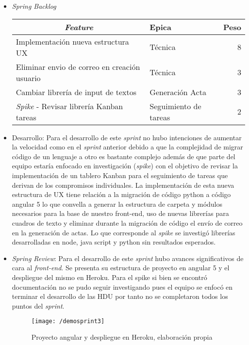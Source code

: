 \begin{itemize}
\begin{itemize}
\item \textit{Spring Backlog}

\begin{table}[!h]
\centering
\label{tab:backlog3}
\begin{tabular}{|l|l|r|}
\hline
\multicolumn{1}{|c|}{\textit{\textbf{Feature}}} & \textbf{Epica} & \textbf{Peso} \\ \hline
Implementación nueva estructura UX & Técnica & 8 \\ \hline
Eliminar envio de correo en creación usuario & Técnica & 3 \\ \hline
Cambiar librería de input de textos & Generación Acta & 3 \\ \hline
\textit{Spike} -  Revisar librería Kanban tareas & Seguimiento de tareas & 2 \\ \hline
\end{tabular}
\end{table}

\item Desarrollo: Para el desarrollo de este \textit{sprint} no hubo intenciones de aumentar la velocidad como en el \textit{sprint} anterior debido a que la complejidad de migrar código de un lenguaje a otro es bastante complejo además de que parte del equipo estaría enfocado en investigación (\textit{spike}) con el objetivo de revisar la implementación de un tablero Kanban para el seguimiento de tareas que derivan de los compromisos individuales. La implementación de esta nueva estructura de UX tiene relación a la migración de código python a código angular 5 lo que convella a generar la estructura de carpeta y módulos necesarios para la base de nuestro front-end, uso de nuevas librerías para cuadros de texto y eliminar durante la migración de código el envío de correo en la generación de actas. Lo que corresponde al \textit{spike} se investigó librerías desarrolladas en node, java script y python sin resultados esperados.

\item \textit{Spring Review}: Para el desarrollo de este \textit{sprint} hubo avances significativos de cara al \textit{front-end}. Se presenta su estructura de proyecto en angular 5 y el despliegue del mismo en Heroku. Para el spike si bien se encontró documentación no se pudo seguir investigando pues el equipo se enfocó en terminar el desarrollo de las HDU por tanto no se completaron todos los puntos del \textit{sprint}.

\begin{figure}[!h]
\centering
\texttt{[image: /demosprint3]}
\label{imga-c3}
\caption{Proyecto angular y despliegue en Heroku, elaboración propia}
\end{figure}


\end{itemize}
\end{itemize}
